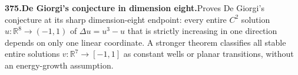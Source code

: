 \documentclass[11pt,a4paper]{article}
\begin{document}
  \par \begin{minipage}{\linewidth}
  \fontsize{10.5}{12.6}\selectfont\RaggedRight
  \hypertarget{result 375}{}
  {\bfseries\textcolor{muted}{375.}\enspace De Giorgi's conjecture in dimension eight.}\enspace Proves De Giorgi's conjecture at its sharp dimension-eight endpoint: every entire $C^2$ solution $u:\mathbb R^8\to(-1,1)$ of $\Delta u=u^3-u$ that is strictly increasing in one direction depends on only one linear coordinate. A stronger theorem classifies all stable entire solutions $v:\mathbb R^7\to[-1,1]$ as constant wells or planar transitions, without an energy-growth assumption.\par
  \end{minipage}\par\vspace{5pt}
\end{document}
